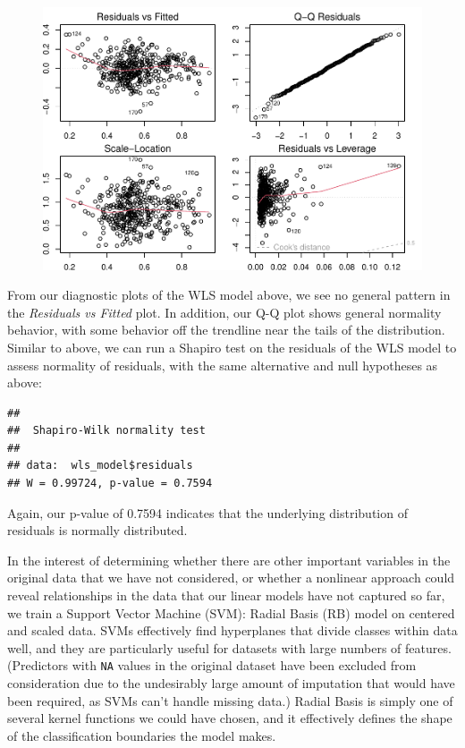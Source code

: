 \documentclass[
  man,floatsintext]{apa6}
\begin{document}
\begin{figure}[H]
\includegraphics[width=\textwidth]{final-project_files/figure-latex/plot-wls-model-1} \caption{ }\label{fig:plot-wls-model}
\end{figure}

From our diagnostic plots of the WLS model above, we see no general pattern in the \emph{Residuals vs Fitted} plot. In addition, our Q-Q plot shows general normality behavior, with some behavior off the trendline near the tails of the distribution. Similar to above, we can run a Shapiro test on the residuals of the WLS model to assess normality of residuals, with the same alternative and null hypotheses as above:

\begin{verbatim}
## 
##  Shapiro-Wilk normality test
## 
## data:  wls_model$residuals
## W = 0.99724, p-value = 0.7594
\end{verbatim}

Again, our p-value of 0.7594 indicates that the underlying distribution of residuals is normally distributed.

In the interest of determining whether there are other important variables in the original data that we have not considered, or whether a nonlinear approach could reveal relationships in the data that our linear models have not captured so far, we train a Support Vector Machine (SVM): Radial Basis (RB) model on centered and scaled data. SVMs effectively find hyperplanes that divide classes within data well, and they are particularly useful for datasets with large numbers of features. (Predictors with \texttt{NA} values in the original dataset have been excluded from consideration due to the undesirably large amount of imputation that would have been required, as SVMs can't handle missing data.) Radial Basis is simply one of several kernel functions we could have chosen, and it effectively defines the shape of the classification boundaries the model makes.
\end{document}
